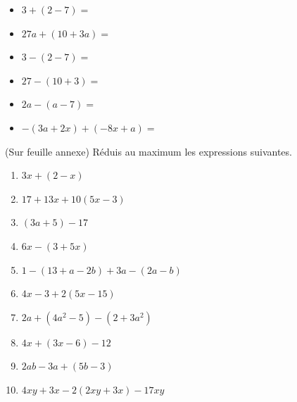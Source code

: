 \documentclass[../math2.tex]{subfiles}
\begin{document}
  \exemples 
  \begin{itemize}[label=$\bullet$, cols=2]
    \item $3+\left(2-7\right)=$
    \item $27a+\left(10+3a\right)=$
  \end{itemize}

\vspace*{1cm}

  \exemples 
  \begin{itemize}[label=$\bullet$, cols=2, itemsep=1.5cm]
    \item $3-\left(2-7\right)=$
    \item $27-\left(10+3\right)=$
    \item $2a-\left(a-7\right)=$
    \item $- (3a + 2x) + (-8x + a)=$
  \end{itemize}

\vspace*{1cm}

\begin{exercise}
  (Sur feuille annexe)  Réduis au maximum les expressions suivantes.
  \begin{enumerate}[cols=2]
    \item  $3x+\left(2-x\right)$
    \item  $17+13x+10\left(5x-3\right)$
    \item  $\left(3a+5\right) -17$
    \item  $6x-\left(3+5x\right)$
    \item  $1-\left(13+a-2b\right) + 3a - \left(2a-b\right)$
    \item $4x-3+2\left(5x-15\right)$
    \item $2a+\left(4a^2-5\right) - \left(2+3a^2\right)$
    \item $4x+\left(3x-6\right) -12$
    \item $2ab-3a+\left(5b-3\right)$
    \item $4xy+3x-2\left(2xy+3x\right) -17xy$
  \end{enumerate}
\end{exercise}
\end{document}
